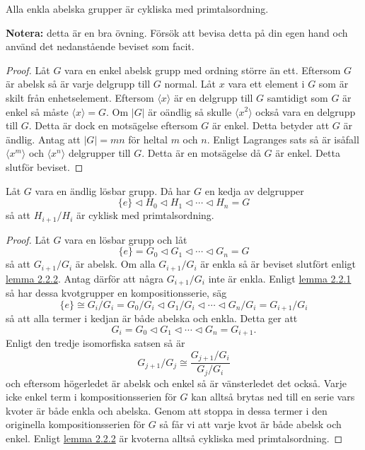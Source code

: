 \documentclass{article}
\theoremstyle{definition}
\begin{document}
\hypertarget{lemma3.2.2}{}
\begin{mylemma}{}{}
  Alla enkla abelska grupper är cykliska med primtalsordning.
\end{mylemma}

\textbf{Notera:} detta är en bra övning. Försök att bevisa detta på din egen hand och använd det nedanstående beviset 
som facit.

\begin{proof}
  Låt $G$ vara en enkel abelsk grupp med ordning större än ett. Eftersom $G$ är abelsk så är varje delgrupp till $G$ normal. Låt $x$ vara 
  ett element i $G$ som är skilt från enhetselement. Eftersom $\langle x \rangle$ är en delgrupp till $G$ samtidigt som $G$ är enkel så måste 
  $\langle x \rangle = G$. Om $|G|$ är oändlig så skulle $\langle x^2 \rangle$ också vara en delgrupp till $G$. Detta är dock en motsägelse
  eftersom $G$ är enkel. Detta betyder att $G$ är ändlig. Antag att $|G| = mn$ för heltal $m$ och $n$. Enligt Lagranges sats så 
  är isåfall $\langle x^m \rangle$ och $\langle x^n \rangle$ delgrupper till $G$. Detta är en motsägelse då $G$ är enkel. Detta slutför beviset.
\end{proof}

\hypertarget{prop3.2.2}{}
\begin{myprop}{}{}
  Låt $G$ vara en ändlig lösbar grupp. Då har $G$ en kedja av delgrupper 
  \[\{e\} \triangleleft H_0 \triangleleft H_1 \triangleleft \cdots \triangleleft H_n = G \]
  så att $H_{i+1}/H_i$ är cyklisk med primtalsordning.  
\end{myprop}

\begin{proof}
  Låt $G$ vara en lösbar grupp och låt 
  \[ \{e\} = G_0 \triangleleft G_1 \triangleleft \cdots \triangleleft G_n = G\]
  så att $G_{i+1}/G_i$ är abelsk. Om alla $G_{i+1}/G_i$ är enkla så är beviset slutfört enligt \hyperlink{lemma3.2.2}{lemma 2.2.2}.
  Antag därför att några $G_{i+1}/G_i$ inte är enkla. Enligt \hyperlink{lemma3.2.1}{lemma 2.2.1} så har dessa kvotgrupper en kompositionsserie, säg 
  \[ \{e\} \cong G_i/G_i = G_0/G_i \triangleleft G_1/G_i\triangleleft \cdots \triangleleft G_n/G_i = G_{i+1}/G_i \]
  så att alla termer i kedjan är både abelska och enkla. Detta ger att
  \[G_i = G_0 \triangleleft G_1 \triangleleft \cdots \triangleleft G_n = G_{i+1}.\]
  Enligt den tredje isomorfiska satsen så är 
  \[G_{j+1}/G_j \cong \frac{G_{j+1}/G_i}{G_j/G_i}\]
  och eftersom högerledet är abelsk och enkel så är vänsterledet det också. Varje icke enkel term i kompositionsserien för $G$ kan alltså brytas 
  ned till en serie vars kvoter är både enkla och abelska. Genom att stoppa in dessa termer i den originella kompositionsserien för $G$
  så får vi att varje kvot är både abelsk och enkel. Enligt \hyperlink{lemma3.2.2}{lemma 2.2.2} är kvoterna alltså cykliska med primtalsordning.
\end{proof}
\end{document}
